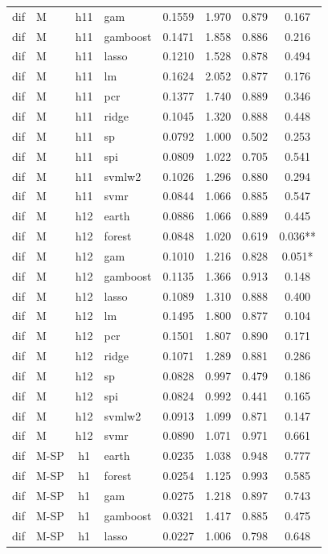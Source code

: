 \begin{ThreePartTable}
\begin{longtable}[t]{llclcccc}
dif & M & h11 & gam & 0.1559 & 1.970 & 0.879 & 0.167\\
dif & M & h11 & gamboost & 0.1471 & 1.858 & 0.886 & 0.216\\
dif & M & h11 & lasso & 0.1210 & 1.528 & 0.878 & 0.494\\
dif & M & h11 & lm & 0.1624 & 2.052 & 0.877 & 0.176\\
dif & M & h11 & pcr & 0.1377 & 1.740 & 0.889 & 0.346\\
dif & M & h11 & ridge & 0.1045 & 1.320 & 0.888 & 0.448\\
dif & M & h11 & sp & 0.0792 & 1.000 & 0.502 & 0.253\\
dif & M & h11 & spi & 0.0809 & 1.022 & 0.705 & 0.541\\
dif & M & h11 & svmlw2 & 0.1026 & 1.296 & 0.880 & 0.294\\
dif & M & h11 & svmr & 0.0844 & 1.066 & 0.885 & 0.547\\
\addlinespace
dif & M & h12 & earth & 0.0886 & 1.066 & 0.889 & 0.445\\
dif & M & h12 & forest & 0.0848 & 1.020 & 0.619 & 0.036**\\
dif & M & h12 & gam & 0.1010 & 1.216 & 0.828 & 0.051*\\
dif & M & h12 & gamboost & 0.1135 & 1.366 & 0.913 & 0.148\\
dif & M & h12 & lasso & 0.1089 & 1.310 & 0.888 & 0.400\\
dif & M & h12 & lm & 0.1495 & 1.800 & 0.877 & 0.104\\
dif & M & h12 & pcr & 0.1501 & 1.807 & 0.890 & 0.171\\
dif & M & h12 & ridge & 0.1071 & 1.289 & 0.881 & 0.286\\
dif & M & h12 & sp & 0.0828 & 0.997 & 0.479 & 0.186\\
dif & M & h12 & spi & 0.0824 & 0.992 & 0.441 & 0.165\\
dif & M & h12 & svmlw2 & 0.0913 & 1.099 & 0.871 & 0.147\\
dif & M & h12 & svmr & 0.0890 & 1.071 & 0.971 & 0.661\\
\addlinespace
dif & M-SP & h1 & earth & 0.0235 & 1.038 & 0.948 & 0.777\\
dif & M-SP & h1 & forest & 0.0254 & 1.125 & 0.993 & 0.585\\
dif & M-SP & h1 & gam & 0.0275 & 1.218 & 0.897 & 0.743\\
dif & M-SP & h1 & gamboost & 0.0321 & 1.417 & 0.885 & 0.475\\
dif & M-SP & h1 & lasso & 0.0227 & 1.006 & 0.798 & 0.648\\

\end{longtable}
\end{ThreePartTable}
